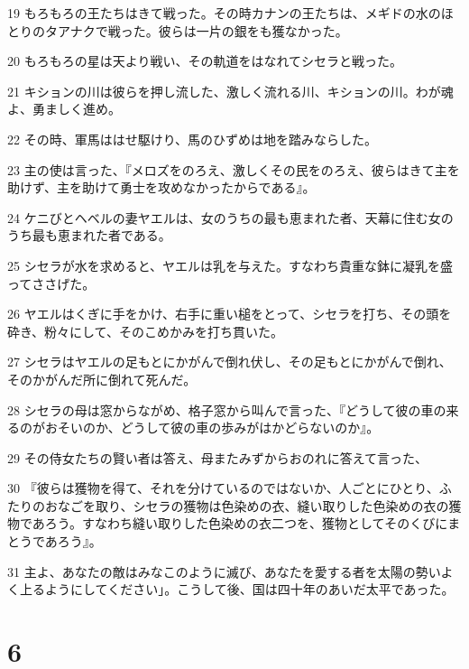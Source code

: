 \par 19 もろもろの王たちはきて戦った。その時カナンの王たちは、メギドの水のほとりのタアナクで戦った。彼らは一片の銀をも獲なかった。
\par 20 もろもろの星は天より戦い、その軌道をはなれてシセラと戦った。
\par 21 キションの川は彼らを押し流した、激しく流れる川、キションの川。わが魂よ、勇ましく進め。
\par 22 その時、軍馬ははせ駆けり、馬のひずめは地を踏みならした。
\par 23 主の使は言った、『メロズをのろえ、激しくその民をのろえ、彼らはきて主を助けず、主を助けて勇士を攻めなかったからである』。
\par 24 ケニびとヘベルの妻ヤエルは、女のうちの最も恵まれた者、天幕に住む女のうち最も恵まれた者である。
\par 25 シセラが水を求めると、ヤエルは乳を与えた。すなわち貴重な鉢に凝乳を盛ってささげた。
\par 26 ヤエルはくぎに手をかけ、右手に重い槌をとって、シセラを打ち、その頭を砕き、粉々にして、そのこめかみを打ち貫いた。
\par 27 シセラはヤエルの足もとにかがんで倒れ伏し、その足もとにかがんで倒れ、そのかがんだ所に倒れて死んだ。
\par 28 シセラの母は窓からながめ、格子窓から叫んで言った、『どうして彼の車の来るのがおそいのか、どうして彼の車の歩みがはかどらないのか』。
\par 29 その侍女たちの賢い者は答え、母またみずからおのれに答えて言った、
\par 30 『彼らは獲物を得て、それを分けているのではないか、人ごとにひとり、ふたりのおなごを取り、シセラの獲物は色染めの衣、縫い取りした色染めの衣の獲物であろう。すなわち縫い取りした色染めの衣二つを、獲物としてそのくびにまとうであろう』。
\par 31 主よ、あなたの敵はみなこのように滅び、あなたを愛する者を太陽の勢いよく上るようにしてください」。こうして後、国は四十年のあいだ太平であった。

\chapter{6}

